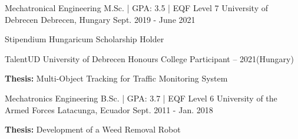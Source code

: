 

\begin{cventries}

  \cventry
    {Mechatronical Engineering M.Sc. | GPA: 3.5 | EQF Level 7} %
    {University of Debrecen} %
    {Debrecen, Hungary} %
    {Sept. 2019 - June 2021} %
    {
      \begin{cvitems} %
        \item {Stipendium Hungaricum Scholarship Holder}
        \item {TalentUD University of Debrecen Honours College Participant – 2021(Hungary) }
        \item {\textbf{Thesis:} Multi-Object Tracking for Traffic Monitoring System  } %
      \end{cvitems}
    }
  
    \cventry
    {Mechatronics Engineering B.Sc. | GPA: 3.7 | EQF Level 6} %
    {University of the Armed Forces} %
    {Latacunga, Ecuador} %
    {Sept. 2011 - Jan. 2018} %
    {
      \begin{cvitems} %
        \item {\textbf{Thesis:} Development of a Weed Removal Robot  } %
      \end{cvitems}
    }

\end{cventries}
